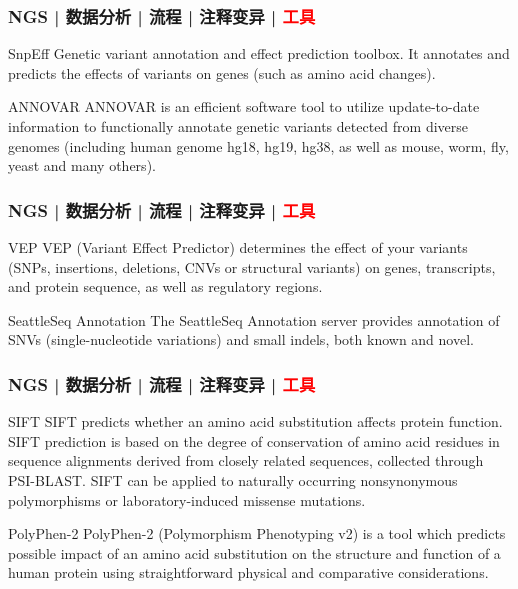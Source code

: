 \begin{frame}
  \frametitle{NGS | 数据分析 | 流程 | 注释变异 | \textcolor{red}{工具}}
  \begin{block}{SnpEff}
    Genetic variant annotation and effect prediction toolbox. It annotates and predicts the effects of variants on genes (such as amino acid changes).
  \end{block}
  \pause
  \begin{block}{ANNOVAR}
    ANNOVAR is an efficient software tool to utilize update-to-date information to functionally annotate genetic variants detected from diverse genomes (including human genome hg18, hg19, hg38, as well as mouse, worm, fly, yeast and many others).
  \end{block}
\end{frame}

\begin{frame}
  \frametitle{NGS | 数据分析 | 流程 | 注释变异 | \textcolor{red}{工具}}
  \begin{block}{VEP}
    VEP (Variant Effect Predictor) determines the effect of your variants (SNPs, insertions, deletions, CNVs or structural variants) on genes, transcripts, and protein sequence, as well as regulatory regions.
  \end{block}
  \pause
  \begin{block}{SeattleSeq Annotation}
    The SeattleSeq Annotation server provides annotation of SNVs (single-nucleotide variations) and small indels, both known and novel.
  \end{block}
\end{frame}

\begin{frame}
  \frametitle{NGS | 数据分析 | 流程 | 注释变异 | \textcolor{red}{工具}}
  \begin{block}{SIFT}
    SIFT predicts whether an amino acid substitution affects protein function. SIFT prediction is based on the degree of conservation of amino acid residues in sequence alignments derived from closely related sequences, collected through PSI-BLAST. SIFT can be applied to naturally occurring nonsynonymous polymorphisms or laboratory-induced missense mutations.
  \end{block}
  \pause
  \begin{block}{PolyPhen-2}
    PolyPhen-2 (Polymorphism Phenotyping v2) is a tool which predicts possible impact of an amino acid substitution on the structure and function of a human protein using straightforward physical and comparative considerations.
  \end{block}
\end{frame}

